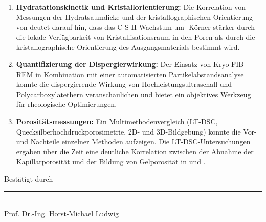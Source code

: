 \documentclass[11pt, a4paper]{article}
\begin{document}
\begin{enumerate}[label=\textbf{\arabic*.}, leftmargin=1.5cm, labelsep=0.5cm, itemsep=0.5em, resume]
    \item \textbf{Hydratationskinetik und Kristallorientierung:} Die Korrelation von Messungen der Hydratsaumdicke und der kristallographischen Orientierung von  deutet darauf hin, dass das C-S-H-Wachstum um -Körner stärker durch die lokale Verfügbarkeit von Kristallisationsraum in den Poren als durch die kristallographische Orientierung des Ausgangsmaterials  bestimmt wird.
    \item \textbf{Quantifizierung der Dispergierwirkung:} Der Einsatz von Kryo-FIB-REM in Kombination mit einer automatisierten Partikelabstandsanalyse konnte die dispergierende Wirkung von Hochleistungsultraschall und Polycarboxylatethern veranschaulichen und bietet ein objektives Werkzeug für rheologische Optimierungen.
    \item \textbf{Porositätsmessungen:} Ein Multimethodenvergleich (LT-DSC, Quecksilberhochdruckporosimetrie, 2D- und 3D-Bildgebung) konnte die Vor- und Nachteile einzelner Methoden aufzeigen. Die LT-DSC-Untersuchungen ergaben über die Zeit eine deutliche Korrelation zwischen der Abnahme der Kapillarporosität und der Bildung von Gelporosität in  und .
\end{enumerate}

\vfill

\noindent Bestätigt durch

\vspace{2cm}
\noindent\rule{7cm}{0.4pt}\\
Prof. Dr.-Ing. Horst-Michael Ludwig
\end{document}

